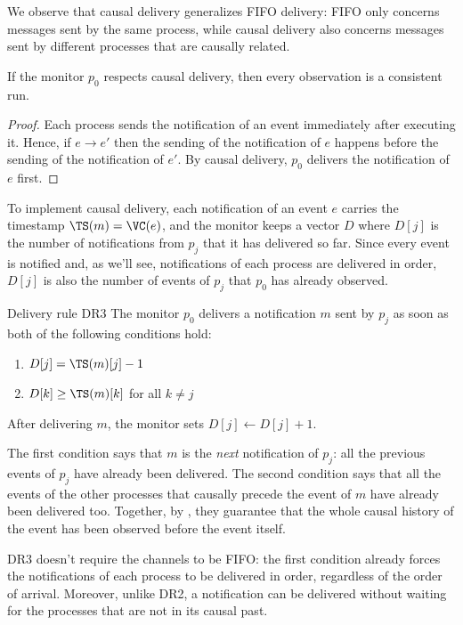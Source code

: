 We observe that causal delivery generalizes FIFO delivery: FIFO only concerns messages sent by the same process, while causal delivery also concerns messages sent by different processes that are causally related.

\begin{framedprop}{}
  If the monitor $p_0$ respects causal delivery, then every observation is a consistent run.
\end{framedprop}

\begin{proof}
  Each process sends the notification of an event immediately after executing it. Hence, if $e \to e'$ then the sending of the notification of $e$ happens before the sending of the notification of $e'$. By causal delivery, $p_0$ delivers the notification of $e$ first.
\end{proof}

To implement causal delivery, each notification of an event $e$ carries the timestamp $\TS(m) = \VC(e)$, and the monitor keeps a vector $D$ where $D[j]$ is the number of notifications from $p_j$ that it has delivered so far. Since every event is notified and, as we'll see, notifications of each process are delivered in order, $D[j]$ is also the number of events of $p_j$ that $p_0$ has already observed.

\begin{frameddefn}{Delivery rule DR3}
  The monitor $p_0$ delivers a notification $m$ sent by $p_j$ as soon as both of the following conditions hold:
  \begin{enumerate}
    \item $D[j] = \TS(m)[j] - 1$
    \item $D[k] \geq \TS(m)[k]$ for all $k \neq j$
  \end{enumerate}
  After delivering $m$, the monitor sets $D[j] \leftarrow D[j] + 1$.
\end{frameddefn}

The first condition says that $m$ is the \textit{next} notification of $p_j$: all the previous events of $p_j$ have already been delivered. The second condition says that all the events of the other processes that causally precede the event of $m$ have already been delivered too. Together, by , they guarantee that the whole causal history of the event has been observed before the event itself.

\begin{framedobs}{}
  DR3 doesn't require the channels to be FIFO: the first condition already forces the notifications of each process to be delivered in order, regardless of the order of arrival. Moreover, unlike DR2, a notification can be delivered without waiting for the processes that are not in its causal past.
\end{framedobs}

